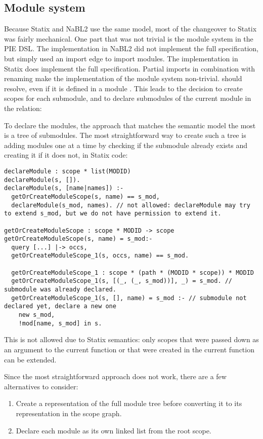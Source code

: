 \subsection{\label{subsec:solution__statix__module_system}Module system}
Because Statix and \ac{NaBL2} use the same model, most of the changeover to Statix was fairly mechanical.
One part that was not trivial is the module system in the \ac{PIE} \ac{DSL}.
The implementation in \ac{NaBL2} did not implement the full specification, but simply used an import edge to import modules. 
The implementation in Statix does implement the full specification.
Partial imports  in combination with renaming make the implementation of the module system non-trivial.
 should resolve, even if it is defined in a module .
This leads to the decision to create scopes for each submodule, and to declare submodules of the current module in the  relation:

To declare the modules, the approach that matches the semantic model the most is a tree of submodules.
The most straightforward way to create such a tree is adding modules one at a time by checking if the submodule already exists and creating it if it does not, in Statix code:
\begin{lstlisting}
declareModule : scope * list(MODID)
declareModule(s, []).
declareModule(s, [name|names]) :-
  getOrCreateModuleScope(s, name) == s_mod,
  declareModule(s_mod, names). // not allowed: declareModule may try to extend s_mod, but we do not have permission to extend it.

getOrCreateModuleScope : scope * MODID -> scope
getOrCreateModuleScope(s, name) = s_mod:-
  query [...] |-> occs,
  getOrCreateModuleScope_1(s, occs, name) == s_mod.

  getOrCreateModuleScope_1 : scope * (path * (MODID * scope)) * MODID
  getOrCreateModuleScope_1(s, [(_, (_, s_mod))], _) = s_mod. // submodule was already declared.
  getOrCreateModuleScope_1(s, [], name) = s_mod :- // submodule not declared yet, declare a new one
    new s_mod,
    !mod[name, s_mod] in s.
\end{lstlisting}
This is not allowed due to Statix semantics: only scopes that were passed down as an argument to the current function or that were created in the current function can be extended.

Since the most straightforward approach does not work, there are a few alternatives to consider:
\begin{enumerate}
  \item Create a representation of the full module tree before converting it to its representation in the scope graph.
  \item Declare each module as its own linked list from the root scope.
\end{enumerate}


